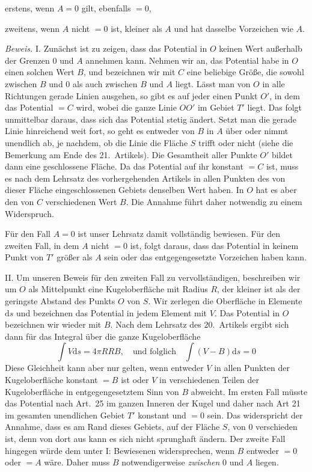 \noindent erstens, wenn $A=0$ gilt, ebenfalls $=0$,

\noindent zweitens, wenn $A$ nicht $=0$ ist, kleiner als $A$ und hat dasselbe Vorzeichen wie $A$.

\textit{Beweis.} I. Zunächst ist zu zeigen, dass das Potential in $O$ keinen Wert außerhalb der Grenzen $0$ und $A$ annehmen kann. Nehmen wir an, das Potential habe in $O$ einen solchen Wert $B$, und bezeichnen wir mit $C$ eine beliebige Größe, die sowohl zwischen $B$ und $0$ als auch zwischen $B$ und $A$ liegt. Lässt man von $O$ in alle Richtungen gerade Linien ausgehen, so gibt es auf jeder einen Punkt $O'$, in dem das Potential $=C$ wird, wobei die ganze Linie $OO'$ im Gebiet $T'$ liegt. Das folgt unmittelbar daraus, dass sich das Potential stetig ändert. Setzt man die gerade Linie hinreichend weit fort, so geht es entweder von $B$ in $A$ über oder nimmt unendlich ab, je nachdem, ob die Linie die Fläche $S$ trifft oder nicht (siehe die Bemerkung am Ende des 21.\ Artikels). Die Gesamtheit aller Punkte $O'$ bildet dann eine geschlossene Fläche. Da das Potential auf ihr konstant $=C$ ist, muss es nach dem Lehrsatz des vorhergehenden Artikels in allen Punkten des von dieser Fläche eingeschlossenen Gebiets denselben Wert haben. In $O$ hat es aber den von $C$ verschiedenen Wert $B$. Die Annahme führt daher notwendig zu einem Widerspruch.

Für den Fall $A=0$ ist unser Lehrsatz damit vollständig bewiesen. Für den zweiten Fall, in dem $A$ nicht $=0$ ist, folgt daraus, dass das Potential in keinem Punkt von $T'$ größer als $A$ sein oder das entgegengesetzte Vorzeichen haben kann.

II. Um unseren Beweis für den zweiten Fall zu vervollständigen, beschreiben wir um $O$ als Mittelpunkt eine Kugeloberfläche mit Radius $R$, der kleiner ist als der geringste Abstand des Punkts $O$ von $S$. Wir zerlegen die Oberfläche in Elemente $\mathrm ds$ und bezeichnen das Potential in jedem Element mit $V$. Das Potential in $O$ bezeichnen wir wieder mit $B$. Nach dem Lehrsatz des 20.\ Artikels ergibt sich dann für das Integral über die ganze Kugeloberfläche
\[
\int V\mathrm ds=4\pi RRB,\quad\text{und folglich}\quad\int(V-B)\mathrm ds=0
\]
Diese Gleichheit kann aber nur gelten, wenn entweder $V$ in allen Punkten der Kugeloberfläche konstant $=B$ ist oder $V$ in verschiedenen Teilen der Kugeloberfläche in entgegengesetztem Sinn von $B$ abweicht. Im ersten Fall müsste das Potential nach Art.\ 25 im ganzen Inneren der Kugel und daher nach Art 21 im gesamten unendlichen Gebiet $T'$ konstant und $=0$ sein. Das widerspricht der Annahme, dass es am Rand dieses Gebiets, auf der Fläche $S$, von $0$ verschieden ist, denn von dort aus kann es sich nicht sprunghaft ändern. Der zweite Fall hingegen würde dem unter I: Bewiesenen widersprechen, wenn $B$ entweder $=0$ oder $=A$ wäre. Daher muss $B$ notwendigerweise \textit{zwischen} $0$ und $A$ liegen.

